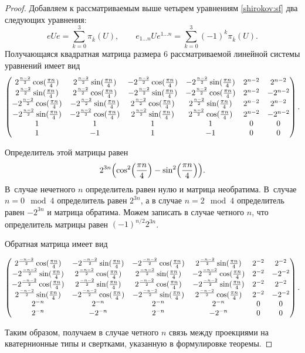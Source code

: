 \begin{proof}
Добавляем к рассматриваемым выше четырем уравнениям \eqref{shirokov:sf} два следующих уравнения:
$$eUe=\sum_{k=0}^3 \pi_{\overline k}(U),\qquad e_{1\ldots n}Ue^{1\ldots n}=\sum_{k=0}^3 (-1)^k \pi_{\overline k}(U).$$
Получающаяся квадратная матрица размера 6 рассматриваемой линейной системы уравнений имеет вид
{\small
\begin{eqnarray*}
\begin{pmatrix}
2^{\frac{n-2}{2}}\cos(\frac{\pi n}{4}) & 2^{\frac{n-2}{2}}\sin(\frac{\pi n}{4})& -2^{\frac{n-2}{2}}\cos(\frac{\pi n}{4}) & -2^{\frac{n-2}{2}}\sin(\frac{\pi n}{4})  & 2^{n-2} & 2^{n-2}\cr
2^{\frac{n-2}{2}}\sin(\frac{\pi n}{4}) & 2^{\frac{n-2}{2}}\cos(\frac{\pi n}{4})& -2^{\frac{n-2}{2}}\sin(\frac{\pi n}{4}) & -2^{\frac{n-2}{2}}\cos(\frac{\pi n}{4})  & 2^{n-2} & -2^{n-2}\cr
-2^{\frac{n-2}{2}}\cos(\frac{\pi n}{4}) & -2^{\frac{n-2}{2}}\sin(\frac{\pi n}{4})& 2^{\frac{n-2}{2}}\cos(\frac{\pi n}{4}) & 2^{\frac{n-2}{2}}\sin(\frac{\pi n}{4})  & 2^{n-2} & 2^{n-2}\cr
-2^{\frac{n-2}{2}}\sin(\frac{\pi n}{4}) & -2^{\frac{n-2}{2}}\cos(\frac{\pi n}{4})& 2^{\frac{n-2}{2}}\sin(\frac{\pi n}{4}) & 2^{\frac{n-2}{2}}\cos(\frac{\pi n}{4})  & 2^{n-2} & -2^{n-2}\cr
1 & 1& 1 & 1  & 0& 0\cr
1 & -1& 1 & -1  & 0 & 0\cr
\end{pmatrix}.\nonumber
\end{eqnarray*}
}

\noindent
Определитель этой матрицы равен $$2^{3n} \Bigl(\cos^2\Bigl(\frac{\pi n}{4}\Bigr)-\sin^2\Bigl(\frac{\pi n}{4}\Bigr)\Bigr).$$
В~случае нечетного $n$ определитель равен нулю и матрица необратима. 
В~случае $n=0\mod 4$ определитель равен $2^{3n}$, а в случае $n=2\mod 4$ определитель равен $-2^{3n}$ и матрица обратима. 
Можем записать в случае четного $n$, что определитель матрицы равен $(-1)^{{n}/{2}}2^{3n}$.

Обратная матрица имеет вид
{\small
\begin{eqnarray}
\begin{pmatrix}
2^{\frac{-n-2}{2}}\cos(\frac{\pi n}{4}) & -2^{\frac{-n-2}{2}}\sin(\frac{\pi n}{4})& -2^{\frac{-n-2}{2}}\cos(\frac{\pi n}{4}) & 2^{\frac{-n-2}{2}}\sin(\frac{\pi n}{4})  & 2^{-2} & 2^{-2}\cr
-2^{\frac{-n-2}{2}}\sin(\frac{\pi n}{4}) & 2^{\frac{-n-2}{2}}\cos(\frac{\pi n}{4})& 2^{\frac{-n-2}{2}}\sin(\frac{\pi n}{4}) & -2^{\frac{-n-2}{2}}\cos(\frac{\pi n}{4})  & 2^{-2} & -2^{-2}\cr
-2^{\frac{-n-2}{2}}\cos(\frac{\pi n}{4}) & 2^{\frac{-n-2}{2}}\sin(\frac{\pi n}{4})& 2^{\frac{-n-2}{2}}\cos(\frac{\pi n}{4}) & -2^{\frac{-n-2}{2}}\sin(\frac{\pi n}{4})  & 2^{-2} & 2^{-2}\cr
2^{\frac{-n-2}{2}}\sin(\frac{\pi n}{4}) & -2^{\frac{-n-2}{2}}\cos(\frac{\pi n}{4})& -2^{\frac{-n-2}{2}}\sin(\frac{\pi n}{4}) & 2^{\frac{-n-2}{2}}\cos(\frac{\pi n}{4})  & 2^{-2} & -2^{-2}\cr
2^{-n} & 2^{-n}& 2^{-n} & 2^{-n}  & 0& 0\cr
2^{-n} & -2^{-n}& 2^{-n} & -2^{-n}  & 0 & 0\cr
\end{pmatrix}.\nonumber
\end{eqnarray}

}

Таким образом, получаем в случае четного $n$ связь между проекциями на кватернионные типы и свертками, указанную в формулировке теоремы.
\end{proof}

